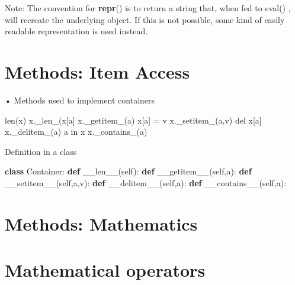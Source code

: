 \documentclass[
  letterpaper,
  DIV=11,
  numbers=noendperiod]{scrreprt}
\newenvironment{Shaded}{\begin{snugshade}}{\end{snugshade}}
\newcommand{\FunctionTok}[1]{\textcolor[rgb]{0.28,0.35,0.67}{#1}}
\newcommand{\KeywordTok}[1]{\textcolor[rgb]{0.00,0.23,0.31}{\textbf{#1}}}
\newcommand{\NormalTok}[1]{\textcolor[rgb]{0.00,0.23,0.31}{#1}}
\newcommand{\VariableTok}[1]{\textcolor[rgb]{0.07,0.07,0.07}{#1}}
\begin{document}
Note: The convention for \textbf{repr}() is to return a string that,
when fed to eval() , will recreate the underlying object. If this is not
possible, some kind of easily readable representation is used instead.


\chapter{Methods: Item Access}\label{methods-item-access}

• Methods used to implement containers

\begin{Shaded}
\begin{Highlighting}[]
\NormalTok{len(x) x.\_len\_(x[a] x.\_getitem\_(a)  }
\NormalTok{x[a] = v x.\_setitem\_(a,v)  }
\NormalTok{del x[a] x.\_delitem\_(a)  }
\NormalTok{a in x x.\_contains\_(a) }
\end{Highlighting}
\end{Shaded}

Definition in a class

\begin{Shaded}
\begin{Highlighting}[]
\KeywordTok{class}\NormalTok{ Container: }\KeywordTok{def} \FunctionTok{\_\_len\_\_}\NormalTok{(}\VariableTok{self}\NormalTok{): }\KeywordTok{def} \FunctionTok{\_\_getitem\_\_}\NormalTok{(}\VariableTok{self}\NormalTok{,a): }\KeywordTok{def} \FunctionTok{\_\_setitem\_\_}\NormalTok{(}\VariableTok{self}\NormalTok{,a,v): }\KeywordTok{def} \FunctionTok{\_\_delitem\_\_}\NormalTok{(}\VariableTok{self}\NormalTok{,a): }\KeywordTok{def} \FunctionTok{\_\_contains\_\_}\NormalTok{(}\VariableTok{self}\NormalTok{,a): }
\end{Highlighting}
\end{Shaded}


\chapter{Methods: Mathematics}\label{methods-mathematics}


\chapter{Mathematical operators}\label{mathematical-operators}
\end{document}
